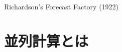 \documentclass[dvipdfmx]{beamer}
\begin{document}
\begin{frame}[t,fragile]{Richardson's Forecast Factory (1922)}
\end{frame}

\section{並列計算とは}
\end{document}
